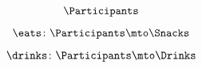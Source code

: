 \begin{forslides}
    \begin{equation}
        \label{eq:parallelism-051}
        \Participants
    \end{equation}

    \begin{equation}
        \label{eq:parallelism-052}
        \eats\colon \Participants \mto \Snacks
    \end{equation}

    \begin{equation}
        \label{eq:parallelism-053}
        \drinks\colon \Participants \mto \Drinks
    \end{equation}

\begin{comment}
    \begin{equation}
        \label{eq:parallelism-054}
        \catprodphi_{\eats,\drinks} \colon \Participants \to \Snacks \cartprod \Drinks
    \end{equation}

    \begin{equation}
        \label{eq:parallelism-055}
        \Snacks \mfrom \Snacks \cartprod \Drinks \mto \Drinks
    \end{equation}

    \begin{equation}
        \label{eq:parallelism-056}
        \Snacks \mfrom  \Participants \mto \Drinks
    \end{equation}

    \begin{equation}
        \label{eq:parallelism-057}
        \catprodphi_{\eats,\drinks}
    \end{equation}

    \begin{equation}
        \label{eq:parallelism-058}
        \Obja \mfrom \text{``product of } \Obja \text{ and } \Objb \text{''}  \mto \Objb
    \end{equation}

    \begin{equation}
        \label{eq:parallelism-059}
        \Obja \mfrom \styleobj{T} \mto \Objb
    \end{equation}

    \begin{equation}
        \label{eq:parallelism-060}
        \setA
    \end{equation}

    \begin{equation}
        \label{eq:parallelism-061}
        \setB
    \end{equation}


\end{comment}
\end{forslides}
